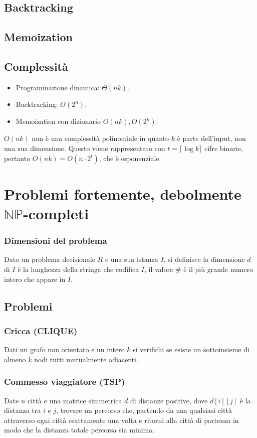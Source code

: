 \subsection{Backtracking}

\subsection{Memoization}

\subsection{Complessit\`a}
\begin{itemize}
	\item Programmazione dinamica: $\Theta(nk)$.
	\item Backtracking: $O(2^n)$.
	\item Memoization con dizionario $O(nk), O(2^n)$.
\end{itemize}
$O(nk)$ non \`e una complessit\`a polinomiale in quanto $k$ \`e parte dell'input, non una sua dimensione. Questo viene rappresentato con $t = \lceil\log k\rceil$ cifre binarie, pertanto
$O(nk) = O(n\cdot 2^t)$, che \`e esponenziale.
\section{Problemi fortemente, debolmente $\mathbf{\mathbb{NP}}$-completi}
\subsubsection{Dimensioni del problema}
Dato un problema decisionale $R$ e una sua istanza $I$, si definisce la dimensione $d$ di $I$ \`e la lunghezza della stringa che codifica $I$, il valore $\#$ \`e il pi\`u grande numero 
intero che appare in $I$.
\subsection{Problemi}
\subsubsection{Cricca (CLIQUE)}
Dati un grafo non orientato e un intero $k$ si verifichi se esiste un sottoinsieme di almeno $k$ nodi tutti mutualmente adiacenti.
\subsubsection{Commesso viaggiatore (TSP)}
Date $n$ citt\`a e una matrice simmetrica $d$ di distanze positive, dove $d[i][j]$ \`e la distanza tra $i$ e $j$, trovare un percorso che, partendo da una qualsiasi citt\`a
attraverso ogni citt\`a esattamente una volta e ritorni alla citt\`a di partenza in modo che la distanza totale percorsa sia minima.
